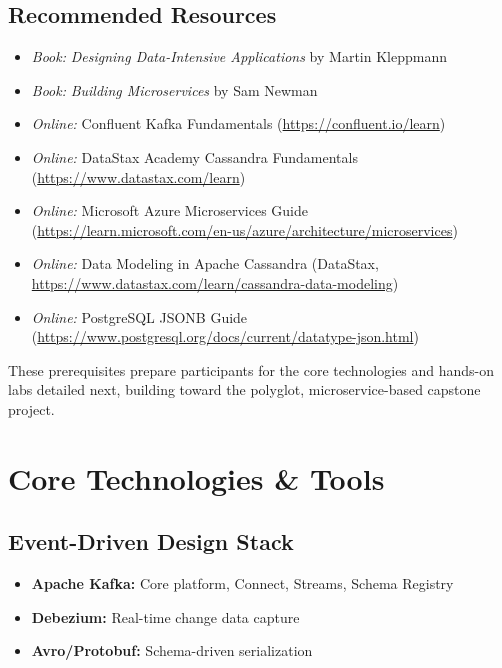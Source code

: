\documentclass[11pt]{article}
\begin{document}
\subsection{Recommended Resources}
\begin{itemize}
    \item \textit{Book:} \textit{Designing Data-Intensive Applications} by Martin Kleppmann
    \item \textit{Book:} \textit{Building Microservices} by Sam Newman
    \item \textit{Online:} Confluent Kafka Fundamentals (\url{https://confluent.io/learn})
    \item \textit{Online:} DataStax Academy Cassandra Fundamentals (\url{https://www.datastax.com/learn})
    \item \textit{Online:} Microsoft Azure Microservices Guide (\url{https://learn.microsoft.com/en-us/azure/architecture/microservices})
    \item \textit{Online:} Data Modeling in Apache Cassandra (DataStax, \url{https://www.datastax.com/learn/cassandra-data-modeling})
    \item \textit{Online:} PostgreSQL JSONB Guide (\url{https://www.postgresql.org/docs/current/datatype-json.html})
\end{itemize}

These prerequisites prepare participants for the core technologies and hands-on labs detailed next, building toward the polyglot, microservice-based capstone project.

\section{Core Technologies \& Tools}

\subsection{Event-Driven Design Stack}
\begin{itemize}
    \item \textbf{Apache Kafka:} Core platform, Connect, Streams, Schema Registry
    \item \textbf{Debezium:} Real-time change data capture
    \item \textbf{Avro/Protobuf:} Schema-driven serialization
\end{itemize}

\end{document}
